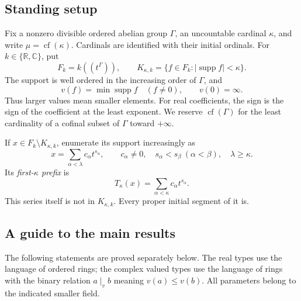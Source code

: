 \documentclass[11pt,letterpaper]{article}
\numberwithin{equation}{section}
\theoremstyle{definition}
\theoremstyle{remark}
\newcommand{\R}{\mathbb R}
\newcommand{\C}{\mathbb C}
\newcommand{\supp}{\operatorname{supp}}
\newcommand{\cf}{\operatorname{cf}}
\begin{document}
\subsection{Standing setup}
Fix a nonzero divisible ordered abelian group $\Gamma$, an uncountable cardinal $\kappa$, and write $\mu=\cf(\kappa)$. Cardinals are identified with their initial ordinals. For $k\in\{\R,\C\}$, put
\begin{equation}\label{fkc:eq:fields}
 F_k=k((t^\Gamma)),\qquad
 K_{\kappa,k}=\{f\in F_k:|\supp f|<\kappa\}.
\end{equation}
The support is well ordered in the increasing order of $\Gamma$, and
\[
 v(f)=\min\supp f\quad(f\ne0),\qquad v(0)=\infty.
\]
Thus larger values mean smaller elements. For real coefficients, the sign is the sign of the coefficient at the least exponent. We reserve $\cf(\Gamma)$ for the least cardinality of a cofinal subset of $\Gamma$ toward $+\infty$.

If $x\in F_k\setminus K_{\kappa,k}$, enumerate its support increasingly as
\begin{equation}\label{fkc:eq:enumerate}
 x=\sum_{\alpha<\lambda}c_\alpha t^{s_\alpha},\qquad
 c_\alpha\ne0,\quad s_\alpha<s_\beta\ (\alpha<\beta),\quad\lambda\ge\kappa.
\end{equation}
Its \emph{first-$\kappa$ prefix} is
\begin{equation}\label{fkc:eq:prefix-intro}
 T_\kappa(x)=\sum_{\alpha<\kappa}c_\alpha t^{s_\alpha}.
\end{equation}
This series itself is not in $K_{\kappa,k}$. Every proper initial segment of it is.

\subsection{A guide to the main results}
The following statements are proved separately below. The real types use the language of ordered rings; the complex valued types use the language of rings with the binary relation $a\mid_v b$ meaning $v(a)\le v(b)$. All parameters belong to the indicated smaller field.
\end{document}

